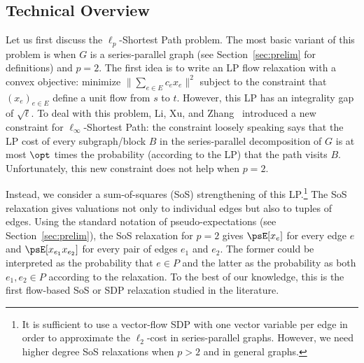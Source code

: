 \documentclass[11pt,a4paper]{article}
\begin{document}





\subsection{Technical Overview}
Let us first discuss the $\ell_p$-Shortest Path problem. The most basic variant of this problem is when $G$ is a series-parallel graph (see Section~\ref{sec:prelim} for definitions) and $p=2$. The first idea is to write an LP flow relaxation with a convex objective: minimize $\|\sum_{e\in E} c_e x_e\|^2$ subject to the constraint that $(x_e)_{e\in E}$ define a unit flow from $s$ to $t$. However, this LP has an integrality gap of $\sqrt{\ell}$. To deal with this problem, Li, Xu, and Zhang~\cite{li2023polylogarithmic} introduced a new constraint for $\ell_{\infty}$-Shortest Path: the constraint loosely speaking says that the LP cost of every subgraph/block $B$ in the series-parallel decomposition of $G$ is at most $\opt$ times the probability (according to the LP) that the path visits $B$. Unfortunately, this new constraint does not help when $p=2$. 

Instead, we consider a sum-of-squares (SoS) strengthening of this LP.\footnote{It is sufficient to use a vector-flow SDP with one vector variable per edge in order to  approximate the $\ell_2$-cost in series-parallel graphs. However, we need higher degree SoS relaxations when $p >2$ and in general graphs.}   The SoS relaxation gives valuations not only to individual edges but also to tuples of edges. Using the standard notation of pseudo-expectations (see Section~\ref{sec:prelim}), the SoS relaxation for $p=2$ gives $\psE[x_e]$ for every edge $e$ and $\psE[x_{e_1}x_{e_2}]$ for every pair of edges $e_1$ and $e_2$. The former could be interpreted as the probability that $e\in P$ and the latter as the probability as both $e_1,e_2\in P$ according to the relaxation.
To the best of our knowledge, this is the first flow-based SoS or SDP relaxation studied in the literature.
\end{document}
